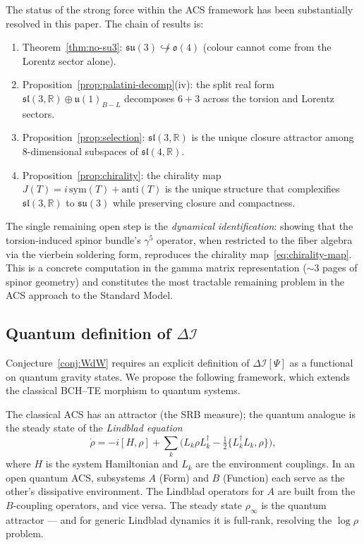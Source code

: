 \documentclass[12pt,a4paper]{article}
\theoremstyle{plain}
\theoremstyle{definition}
\theoremstyle{remark}
\newcommand{\DI}{\Delta\mathcal{I}}
\begin{document}
The status of the strong force within the ACS framework has been
substantially resolved in this paper.  The chain of results is:
\begin{enumerate}[label=(\arabic*),noitemsep]
  \item Theorem~\ref{thm:no-su3}: $\mathfrak{su}(3) \not\hookrightarrow \mathfrak{o}(4)$
    (colour cannot come from the Lorentz sector alone).
  \item Proposition~\ref{prop:palatini-decomp}(iv): the split real form
    $\mathfrak{sl}(3,\mathbb{R}) \oplus \mathfrak{u}(1)_{B-L}$ decomposes
    $6+3$ across the torsion and Lorentz sectors.
  \item Proposition~\ref{prop:selection}: $\mathfrak{sl}(3,\mathbb{R})$ is
    the unique closure attractor among 8-dimensional subspaces of $\mathfrak{sl}(4,\mathbb{R})$.
  \item Proposition~\ref{prop:chirality}: the chirality map $J(T) = i\,\mathrm{sym}(T) + \mathrm{anti}(T)$
    is the unique structure that complexifies $\mathfrak{sl}(3,\mathbb{R})$ to
    $\mathfrak{su}(3)$ while preserving closure and compactness.
\end{enumerate}
The single remaining open step is the \emph{dynamical identification}:
showing that the torsion-induced spinor bundle's $\gamma^5$ operator, when
restricted to the fiber algebra via the vierbein soldering form, reproduces
the chirality map~\eqref{eq:chirality-map}.  This is a concrete computation
in the gamma matrix representation ($\sim\!3$ pages of spinor geometry)
and constitutes the most tractable remaining problem in the ACS approach
to the Standard Model.

\subsection{Quantum definition of $\DI$}

Conjecture~\ref{conj:WdW} requires an explicit definition of $\DI[\Psi]$
as a functional on quantum gravity states.  We propose the following
framework, which extends the classical BCH--TE morphism to quantum systems.

The classical ACS has an attractor (the SRB measure);
the quantum analogue is the steady state of the \emph{Lindblad equation}
\[
  \dot{\rho} = -i[H, \rho] + \textstyle\sum_k \bigl( L_k\rho L_k^\dagger
  - \tfrac{1}{2}\{L_k^\dagger L_k, \rho\}\bigr),
\]
where $H$ is the system Hamiltonian and $L_k$ are the environment couplings.
In an open quantum ACS, subsystems $A$ (Form) and $B$ (Function) each
serve as the other's dissipative environment.  The Lindblad operators for $A$
are built from the $B$-coupling operators, and vice versa.
The steady state $\rho_\infty$ is the quantum attractor --- and for generic
Lindblad dynamics it is full-rank, resolving the $\log\rho$ problem.
\end{document}
